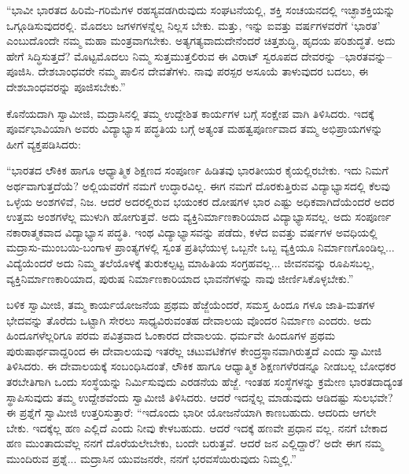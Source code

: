 “ಭಾವೀ ಭಾರತದ ಹಿರಿಮೆ-ಗರಿಮೆಗಳ ರಹಸ್ಯವಡಗಿರುವುದು ಸಂಘಟನೆಯಲ್ಲಿ, ಶಕ್ತಿ ಸಂಚಯನದಲ್ಲಿ ಇಚ್ಛಾಶಕ್ತಿಯನ್ನು ಒಗ್ಗೂಡಿಸುವುದರಲ್ಲಿ. ಮೊದಲು ಜಗಳಗಳನ್ನೆಲ್ಲ ನಿಲ್ಲಸ ಬೇಕು. ಮತ್ತು, ಇನ್ನು ಐವತ್ತು ವರ್ಷಗಳವರೆಗೆ ‘ಭಾರತ’ ಎಂಬುದೊಂದೇ ನಮ್ಮ ಮಹಾ ಮಂತ್ರವಾಗಬೇಕು. ಅತ್ಯಗತ್ಯವಾದುದೇನೆಂದರೆ ಚಿತ್ತಶುದ್ಧಿ, ಹೃದಯ ಪರಿಶುದ್ಧತೆ. ಅದು ಹೇಗೆ ಸಿದ್ಧಿಸುತ್ತದೆ? ಮೊಟ್ಟಮೊದಲು ನಿಮ್ಮ ಸುತ್ತಮುತ್ತಲಿರುವ ಈ ವಿರಾಟ್ ಸ್ವರೂಪದ ದೇವರನ್ನು –ಭಾರತವನ್ನು–ಪೂಜಿಸಿ. ದೇಶಬಾಂಧವರೇ ನಮ್ಮ ಪಾಲಿನ ದೇವತೆಗಳು. ನಾವು ಪರಸ್ಪರ ಅಸೂಯೆ ತಾಳುವುದರ ಬದಲು, ಈ ದೇಶಬಾಂಧವರನ್ನು ಪೂಜಿಸಬೇಕು.”

ಕೊನೆಯದಾಗಿ ಸ್ವಾಮೀಜಿ, ಮದ್ರಾಸಿನಲ್ಲಿ ತಮ್ಮ ಉದ್ದೇಶಿತ ಕಾರ್ಯಗಳ ಬಗ್ಗೆ ಸಂಕ್ಷೇಪ ವಾಗಿ ತಿಳಿಸಿದರು. ಇದಕ್ಕೆ ಪೂರ್ವಭಾವಿಯಾಗಿ ಅವರು ವಿದ್ಯಾಭ್ಯಾಸ ಪದ್ಧತಿಯ ಬಗ್ಗೆ ಅತ್ಯಂತ ಮಹತ್ವಪೂರ್ಣವಾದ ತಮ್ಮ ಅಭಿಪ್ರಾಯಗಳನ್ನು ಹೀಗೆ ವ್ಯಕ್ತಪಡಿಸಿದರು:

“ಭಾರತದ ಲೌಕಿಕ ಹಾಗೂ ಆಧ್ಯಾತ್ಮಿಕ ಶಿಕ್ಷಣದ ಸಂಪೂರ್ಣ ಹಿಡಿತವು ಭಾರತೀಯರ ಕೈಯಲ್ಲಿರಬೇಕು. ಇದು ನಿಮಗೆ ಅರ್ಥವಾಗುತ್ತದೆಯೆ? ಅಲ್ಲಿಯವರೆಗೆ ನಮಗೆ ಉದ್ಧಾರವಿಲ್ಲ. ಈಗ ನಮಗೆ ದೊರಕುತ್ತಿರುವ ವಿದ್ಯಾಭ್ಯಾಸದಲ್ಲಿ ಕೆಲವು ಒಳ್ಳೆಯ ಅಂಶಗಳಿವೆ, ನಿಜ. ಆದರೆ ಅದರಲ್ಲಿರುವ ಭಯಂಕರ ದೋಷಗಳ ಭಾರ ಎಷ್ಟು ಅಧಿಕವಾಗಿದೆಯೆಂದರೆ ಅದರ ಉತ್ತಮ ಅಂಶಗಳೆಲ್ಲ ಮುಳುಗಿ ಹೋಗುತ್ತವೆ. ಅದು ವ್ಯಕ್ತಿನಿರ್ಮಾಣಕಾರಿಯಾದ ವಿದ್ಯಾಭ್ಯಾಸವಲ್ಲ. ಅದು ಸಂಪೂರ್ಣ ನಕಾರಾತ್ಮಕವಾದ ವಿದ್ಯಾಭ್ಯಾಸ ಪದ್ಧತಿ. ಇಂಥ ವಿದ್ಯಾಭ್ಯಾಸವನ್ನು ಪಡೆದು, ಕಳೆದ ಐವತ್ತು ವರ್ಷಗಳ ಅವಧಿಯಲ್ಲಿ ಮದ್ರಾಸು-ಮುಂಬಯಿ-ಬಂಗಾಳ ಪ್ರಾಂತ್ಯಗಳಲ್ಲಿ ಸ್ವಂತ ಪ್ರತಿಭೆಯುಳ್ಳ ಒಬ್ಬನೇ ಒಬ್ಬ ವ್ಯಕ್ತಿಯೂ ನಿರ್ಮಾಣಗೊಂಡಿಲ್ಲ... ವಿದ್ಯೆಯೆಂದರೆ ಅದು ನಿಮ್ಮ ತಲೆಯೊಳಕ್ಕೆ ತುರುಕಲ್ಪಟ್ಟ ಮಾಹಿತಿಯ ಸಂಗ್ರಹವಲ್ಲ... ಜೀವನವನ್ನು ರೂಪಿಸಬಲ್ಲ, ವ್ಯಕ್ತಿನಿರ್ಮಾಣಕಾರಿಯಾದ, ಪುರುಷ ನಿರ್ಮಾಣಕಾರಿಯಾದ ಭಾವನೆಗಳನ್ನು ನಾವು ಜೀರ್ಣಿಸಿಕೊಳ್ಳಬೇಕು.”

ಬಳಿಕ ಸ್ವಾಮೀಜಿ, ತಮ್ಮ ಕಾರ್ಯಯೋಜನೆಯ ಪ್ರಥಮ ಹೆಜ್ಜೆಯೆಂದರೆ, ಸಮಸ್ತ ಹಿಂದೂ ಗಳೂ ಜಾತಿ-ಮತಗಳ ಭೇದವನ್ನು ತೊರೆದು ಒಟ್ಟಾಗಿ ಸೇರಲು ಸಾಧ್ಯವಿರುವಂತಹ ದೇವಾಲಯ ವೊಂದರ ನಿರ್ಮಾಣ ಎಂದರು. ಅದು ಹಿಂದೂಗಳೆಲ್ಲರಿಗೂ ಪರಮ ಪವಿತ್ರವಾದ ಓಂಕಾರದ ದೇವಾಲಯ. ಧರ್ಮವೇ ಹಿಂದೂಗಳ ಪ್ರಥಮ ಪುರುಷಾರ್ಥವಾದ್ದರಿಂದ ಈ ದೇವಾಲಯವು ಇತರೆಲ್ಲ ಚಟುವಟಿಕೆಗಳ ಕೇಂದ್ರಸ್ಥಾನವಾಗಿರುತ್ತದೆ ಎಂದು ಸ್ವಾಮೀಜಿ ತಿಳಿಸಿದರು. ಈ ದೇವಾಲಯಕ್ಕೆ ಸಂಬಂಧಿಸಿದಂತೆ, ಲೌಕಿಕ ಹಾಗೂ ಆಧ್ಯಾತ್ಮಿಕ ಶಿಕ್ಷಣಗಳೆರಡನ್ನೂ ನೀಡಬಲ್ಲ ಬೋಧಕರ ತರಬೇತಿಗಾಗಿ ಒಂದು ಸಂಸ್ಥೆಯನ್ನು ನಿರ್ಮಿಸುವುದು ಎರಡನೆಯ ಹೆಜ್ಜೆ. ಇಂತಹ ಸಂಸ್ಥೆಗಳನ್ನು ಕ್ರಮೇಣ ಭಾರತದಾದ್ಯಂತ ಸ್ಥಾಪಿಸುವುದು ತಮ್ಮ ಉದ್ದೇಶವೆಂದು ಸ್ವಾಮೀಜಿ ತಿಳಿಸಿದರು. ಆದರೆ ಇದನ್ನೆಲ್ಲ ಮಾಡುವುದು ಆಡಿದಷ್ಟು ಸುಲಭವೇ? ಈ ಪ್ರಶ್ನೆಗೆ ಸ್ವಾಮೀಜಿ ಉತ್ತರಿಸುತ್ತಾರೆ: “ಇದೊಂದು ಭಾರೀ ಯೋಜನೆಯಾಗಿ ಕಾಣಬಹುದು. ಆದರಿದು ಆಗಲೇ ಬೇಕು. ಇದಕ್ಕೆಲ್ಲ ಹಣ ಎಲ್ಲಿದೆ ಎಂದು ನೀವು ಕೇಳಬಹುದು. ಆದರೆ ಇದಕ್ಕೆ ಹಣವೇ ಪ್ರಧಾನ ವಲ್ಲ. ನನಗೆ ಬೇಕಾದ ಹಣ ಮುಂತಾದುವೆಲ್ಲ ನನಗೆ ದೊರೆಯಲೇಬೇಕು, ಬಂದೇ ಬರುತ್ತವೆ. ಆದರೆ ಜನ ಎಲ್ಲಿದ್ದಾರೆ? ಅದೇ ಈಗ ನಮ್ಮ ಮುಂದಿರುವ ಪ್ರಶ್ನೆ... ಮದ್ರಾಸಿನ ಯುವಜನರೇ, ನನಗೆ ಭರವಸೆಯಿರುವುದು ನಿಮ್ಮಲ್ಲಿ.”

